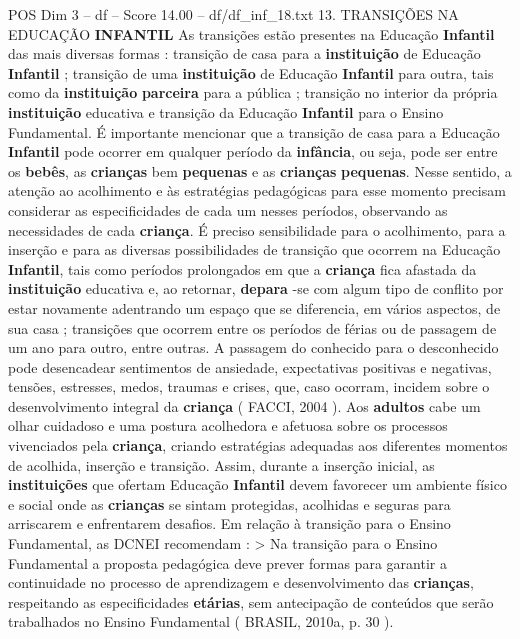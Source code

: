 \begin{textsample}{POS Dim 3 – df – Score 14.00 – df/df\_inf\_18.txt}  \label{ex:f3_pos_130}
13.
TRANSIÇÕES NA EDUCAÇÃO \textbf{INFANTIL} As transições estão presentes na Educação \textbf{Infantil} das mais diversas formas : transição de casa para a \textbf{instituição} de Educação \textbf{Infantil} ; transição de uma \textbf{instituição} de Educação \textbf{Infantil} para outra, tais como da \textbf{instituição} \textbf{parceira} para a pública ; transição no interior da própria \textbf{instituição} educativa e transição da Educação \textbf{Infantil} para o Ensino Fundamental.
É importante mencionar que a transição de casa para a Educação \textbf{Infantil} pode ocorrer em qualquer período da \textbf{infância}, ou seja, pode ser entre os \textbf{bebês}, as \textbf{crianças} bem \textbf{pequenas} e as \textbf{crianças} \textbf{pequenas}.
Nesse sentido, a atenção ao acolhimento e às estratégias pedagógicas para esse momento precisam considerar as especificidades de cada um nesses períodos, observando as necessidades de cada \textbf{criança}.
É preciso sensibilidade para o acolhimento, para a inserção e para as diversas possibilidades de transição que ocorrem na Educação \textbf{Infantil}, tais como períodos prolongados em que a \textbf{criança} fica afastada da \textbf{instituição} educativa e, ao retornar, \textbf{depara} -se com algum tipo de conflito por estar novamente adentrando um espaço que se diferencia, em vários aspectos, de sua casa ; transições que ocorrem entre os períodos de férias ou de passagem de um ano para outro, entre outras.
A passagem do conhecido para o desconhecido pode desencadear sentimentos de ansiedade, expectativas positivas e negativas, tensões, estresses, medos, traumas e crises, que, caso ocorram, incidem sobre o desenvolvimento integral da \textbf{criança} ( FACCI, 2004 ).
Aos \textbf{adultos} cabe um olhar cuidadoso e uma postura acolhedora e afetuosa sobre os processos vivenciados pela \textbf{criança}, criando estratégias adequadas aos diferentes momentos de acolhida, inserção e transição.
Assim, durante a inserção inicial, as \textbf{instituições} que ofertam Educação \textbf{Infantil} devem favorecer um ambiente físico e social onde as \textbf{crianças} se sintam protegidas, acolhidas e seguras para arriscarem e enfrentarem desafios.
Em relação à transição para o Ensino Fundamental, as DCNEI recomendam : > Na transição para o Ensino Fundamental a proposta pedagógica deve prever formas para garantir a continuidade no processo de aprendizagem e desenvolvimento das \textbf{crianças}, respeitando as especificidades \textbf{etárias}, sem antecipação de conteúdos que serão trabalhados no Ensino Fundamental ( BRASIL, 2010a, p. 30 ).

\end{textsample}
